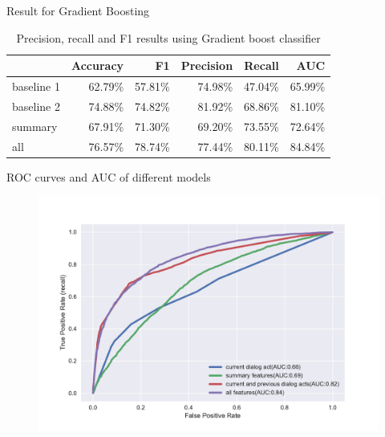 \begin{frame}{Result for Gradient Boosting}
\begin{table}[ht!]
\begin{center}
\begin{tabular}{lrrrrr}
\hline
{}  &  Accuracy &        F1 &  Precision &    Recall &   AUC \\
\hline
baseline 1 &  62.79\% &  57.81\% &   74.98\% &  47.04\% &  65.99\% \\
baseline 2 &  74.88\% &  74.82\% &   81.92\% &  68.86\% &  81.10\% \\
summary    &  67.91\% &  71.30\% &   69.20\% &  73.55\% &  72.64\% \\
all        &  76.57\% &  78.74\% &   77.44\% &  80.11\% &  84.84\% \\
\hline
\end{tabular}
\end{center}
\caption{Precision, recall and F1 results using Gradient boost classifier }
\label{table:result2}
\end{table}
\end{frame}


\begin{frame}{ROC curves and AUC of different models}
\begin{figure}
 \centering
 \includegraphics[width=32em]{../scikitlearn/figures/roc.pdf}
 \end{figure}
\end{frame}

